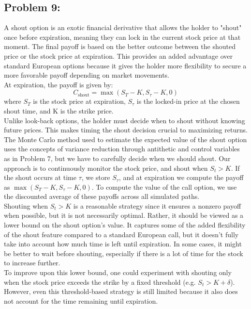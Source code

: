 \documentclass{report}
\begin{document}
\newpage


\subsection*{Problem 9:}
A shout option is an exotic financial derivative that allows the holder to "shout" once before expiration, meaning they can lock in the current stock price at that moment. The final payoff is based on the better outcome between the shouted price or the stock price at expiration. This provides an added advantage over standard European options because it gives the holder more flexibility to secure a more favorable payoff depending on market movements. \\

At expiration, the payoff is given by:
\[
C_{\text{shout}}=\max(S_T - K, S_\tau - K, 0)
\]
where \(S_T\) is the stock price at expiration, \(S_\tau\) is the locked-in price at the chosen shout time, and K is the strike price. \\

Unlike look-back options, the holder must decide when to shout without knowing future prices. This makes timing the shout decision crucial to maximizing returns. \\

The Monte Carlo method used to estimate the expected value of the shout option uses the concepts of variance reduction through antithetic and control variables as in Problem 7, but we have to carefully decide when we should shout. Our approach is to continuously monitor the stock price, and shout when $S_t > K$. If the shout occurs at time $\tau$, we store $S_{\tau}$, and at expiration we compute the payoff as $\max(S_T - K, S_\tau - K, 0)$. To compute the value of the call option, we use the discounted average of these payoffs across all simulated paths. \\

Shouting when $S_t > K$ is a reasonable strategy since it ensures a nonzero payoff when possible, but it is not necessarily optimal. Rather, it should be viewed as a lower bound on the shout option's value. It captures some of the added flexibility of the shout feature compared to a standard European call, but it doesn't fully take into account how much time is left until expiration. In some cases, it might be better to wait before shouting, especially if there is a lot of time for the stock to increase further.  \\

To improve upon this lower bound, one could experiment with shouting only when the stock price exceeds the strike by a fixed threshold (e.g. $S_t > K + \delta$). However, even this threshold-based strategy is still limited because it also does not account for the time remaining until expiration. \\
\end{document}
